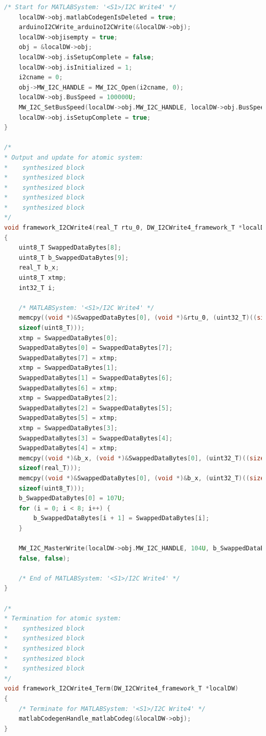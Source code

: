 \begin{lstlisting}[caption={Automatically generated C code}, language=c,label={lst:acg}]
	/* Start for MATLABSystem: '<S1>/I2C Write4' */
	localDW->obj.matlabCodegenIsDeleted = true;
	arduinoI2CWrite_arduinoI2CWrite(&localDW->obj);
	localDW->objisempty = true;
	obj = &localDW->obj;
	localDW->obj.isSetupComplete = false;
	localDW->obj.isInitialized = 1;
	i2cname = 0;
	obj->MW_I2C_HANDLE = MW_I2C_Open(i2cname, 0);
	localDW->obj.BusSpeed = 100000U;
	MW_I2C_SetBusSpeed(localDW->obj.MW_I2C_HANDLE, localDW->obj.BusSpeed);
	localDW->obj.isSetupComplete = true;
}

/*
* Output and update for atomic system:
*    synthesized block
*    synthesized block
*    synthesized block
*    synthesized block
*    synthesized block
*/
void framework_I2CWrite4(real_T rtu_0, DW_I2CWrite4_framework_T *localDW)
{
	uint8_T SwappedDataBytes[8];
	uint8_T b_SwappedDataBytes[9];
	real_T b_x;
	uint8_T xtmp;
	int32_T i;
	
	/* MATLABSystem: '<S1>/I2C Write4' */
	memcpy((void *)&SwappedDataBytes[0], (void *)&rtu_0, (uint32_T)((size_t)8 *
	sizeof(uint8_T)));
	xtmp = SwappedDataBytes[0];
	SwappedDataBytes[0] = SwappedDataBytes[7];
	SwappedDataBytes[7] = xtmp;
	xtmp = SwappedDataBytes[1];
	SwappedDataBytes[1] = SwappedDataBytes[6];
	SwappedDataBytes[6] = xtmp;
	xtmp = SwappedDataBytes[2];
	SwappedDataBytes[2] = SwappedDataBytes[5];
	SwappedDataBytes[5] = xtmp;
	xtmp = SwappedDataBytes[3];
	SwappedDataBytes[3] = SwappedDataBytes[4];
	SwappedDataBytes[4] = xtmp;
	memcpy((void *)&b_x, (void *)&SwappedDataBytes[0], (uint32_T)((size_t)1 *
	sizeof(real_T)));
	memcpy((void *)&SwappedDataBytes[0], (void *)&b_x, (uint32_T)((size_t)8 *
	sizeof(uint8_T)));
	b_SwappedDataBytes[0] = 107U;
	for (i = 0; i < 8; i++) {
		b_SwappedDataBytes[i + 1] = SwappedDataBytes[i];
	}
	
	MW_I2C_MasterWrite(localDW->obj.MW_I2C_HANDLE, 104U, b_SwappedDataBytes, 9U,
	false, false);
	
	/* End of MATLABSystem: '<S1>/I2C Write4' */
}

/*
* Termination for atomic system:
*    synthesized block
*    synthesized block
*    synthesized block
*    synthesized block
*    synthesized block
*/
void framework_I2CWrite4_Term(DW_I2CWrite4_framework_T *localDW)
{
	/* Terminate for MATLABSystem: '<S1>/I2C Write4' */
	matlabCodegenHandle_matlabCodeg(&localDW->obj);
}


\end{lstlisting}
